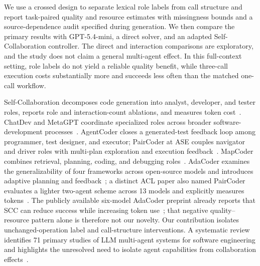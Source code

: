 \documentclass[pdflatex,sn-nature]{scientificreports}
\begin{document}
We use a crossed design to separate lexical role labels from call structure and report task-paired quality and resource estimates with missingness bounds and a source-dependence audit specified during generation. We then compare the primary results with GPT-5.4-mini, a direct solver, and an adapted Self-Collaboration controller. The direct and interaction comparisons are exploratory, and the study does not claim a general multi-agent effect. In this full-context setting, role labels do not yield a reliable quality benefit, while three-call execution costs substantially more and succeeds less often than the matched one-call workflow.



Self-Collaboration decomposes code generation into analyst, developer, and tester roles, reports role and interaction-count ablations, and measures token cost~\cite{dong2023selfcollaboration}. ChatDev and MetaGPT coordinate specialized roles across broader software-development processes~\cite{qian2024chatdev,hong2024metagpt}. AgentCoder closes a generated-test feedback loop among programmer, test designer, and executor; PairCoder at ASE couples navigator and driver roles with multi-plan exploration and execution feedback~\cite{huang2023agentcoder,zhang2024paircoder}. MapCoder combines retrieval, planning, coding, and debugging roles~\cite{islam2024mapcoder}. AdaCoder examines the generalizability of four frameworks across open-source models and introduces adaptive planning and feedback~\cite{zhu2025adacoderpreprint,zhu2026adacoder}; a distinct ACL paper also named PairCoder evaluates a lighter two-agent scheme across 13 models and explicitly measures tokens~\cite{chen2026paircoder}. The publicly available six-model AdaCoder preprint already reports that SCC can reduce success while increasing token use~\cite{zhu2025adacoderpreprint}; that negative quality--resource pattern alone is therefore not our novelty. Our contribution isolates unchanged-operation label and call-structure interventions. A systematic review identifies 71 primary studies of LLM multi-agent systems for software engineering and highlights the unresolved need to isolate agent capabilities from collaboration effects~\cite{he2025lma}.
\end{document}
